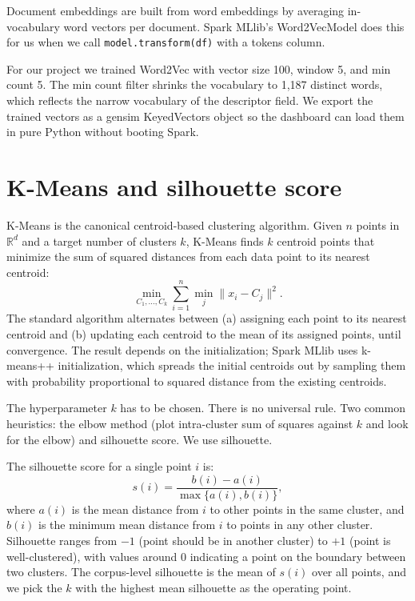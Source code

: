 \documentclass[11pt,letterpaper]{book}
\begin{document}
Document embeddings are built from word embeddings by averaging in-vocabulary word vectors per document. Spark MLlib's Word2VecModel does this for us when we call \texttt{model.transform(df)} with a tokens column.

For our project we trained Word2Vec with vector size 100, window 5, and min count 5. The min count filter shrinks the vocabulary to 1,187 distinct words, which reflects the narrow vocabulary of the descriptor field. We export the trained vectors as a gensim KeyedVectors object so the dashboard can load them in pure Python without booting Spark.

\section{K-Means and silhouette score}

K-Means is the canonical centroid-based clustering algorithm. Given $n$ points in $\mathbb{R}^d$ and a target number of clusters $k$, K-Means finds $k$ centroid points that minimize the sum of squared distances from each data point to its nearest centroid:
\begin{equation}
\min_{C_1, \dots, C_k} \sum_{i=1}^n \min_j \| x_i - C_j \|^2.
\end{equation}
The standard algorithm alternates between (a) assigning each point to its nearest centroid and (b) updating each centroid to the mean of its assigned points, until convergence. The result depends on the initialization; Spark MLlib uses k-means++ initialization, which spreads the initial centroids out by sampling them with probability proportional to squared distance from the existing centroids.

The hyperparameter $k$ has to be chosen. There is no universal rule. Two common heuristics: the elbow method (plot intra-cluster sum of squares against $k$ and look for the elbow) and silhouette score. We use silhouette.

The silhouette score for a single point $i$ is:
\begin{equation}
s(i) = \frac{b(i) - a(i)}{\max\{a(i), b(i)\}},
\end{equation}
where $a(i)$ is the mean distance from $i$ to other points in the same cluster, and $b(i)$ is the minimum mean distance from $i$ to points in any other cluster. Silhouette ranges from $-1$ (point should be in another cluster) to $+1$ (point is well-clustered), with values around $0$ indicating a point on the boundary between two clusters. The corpus-level silhouette is the mean of $s(i)$ over all points, and we pick the $k$ with the highest mean silhouette as the operating point.
\end{document}
